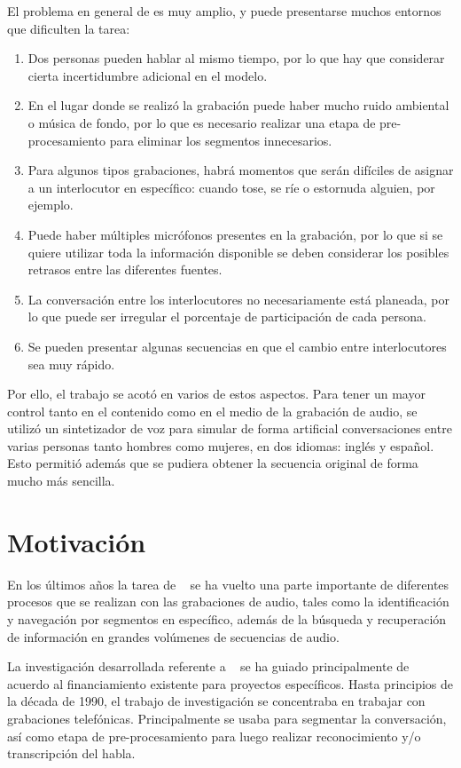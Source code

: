 El problema en general de \sd es muy amplio, y puede presentarse muchos entornos que dificulten la tarea:
\begin{enumerate}
\item Dos personas pueden hablar al mismo tiempo, por lo que hay que considerar cierta incertidumbre adicional en el modelo.
\item En el lugar donde se realizó la grabación puede haber mucho ruido ambiental o música de fondo, por lo que es necesario realizar una etapa de pre-procesamiento para eliminar los segmentos innecesarios.
\item Para algunos tipos grabaciones, habrá momentos que serán difíciles de asignar a un interlocutor en específico: cuando tose, se ríe o estornuda alguien, por ejemplo.
\item Puede haber múltiples micrófonos presentes en la grabación, por lo que si se quiere utilizar toda la información disponible se deben considerar los posibles retrasos entre las diferentes fuentes.
\item La conversación entre los interlocutores no necesariamente está planeada, por lo que puede ser irregular el porcentaje de participación de cada persona. 
\item Se pueden presentar algunas secuencias en que el cambio entre interlocutores sea muy rápido. 
\end{enumerate}

Por ello, el trabajo se acotó en varios de estos aspectos. Para tener un mayor control tanto en el contenido como en el medio de la grabación de audio, se utilizó un sintetizador de voz para simular de forma artificial conversaciones entre varias personas tanto hombres como mujeres, en dos idiomas: inglés y español. Esto permitió además que se pudiera obtener la secuencia original de forma mucho más sencilla.

\section{Motivación}
\label{sec:lemotiv}

En los últimos años la tarea de \SD~ se ha vuelto una parte importante de diferentes procesos que se realizan con las grabaciones de audio, tales como la identificación y navegación por segmentos en específico, además de la búsqueda y recuperación de información en grandes volúmenes de secuencias de audio.

La investigación desarrollada referente a \sd~ se ha guiado principalmente de acuerdo al financiamiento existente para proyectos específicos. Hasta principios de la década de 1990, el trabajo de investigación se concentraba en trabajar con grabaciones telefónicas. Principalmente se usaba para segmentar la conversación, así como etapa de pre-procesamiento para luego realizar reconocimiento y/o transcripción del habla.

